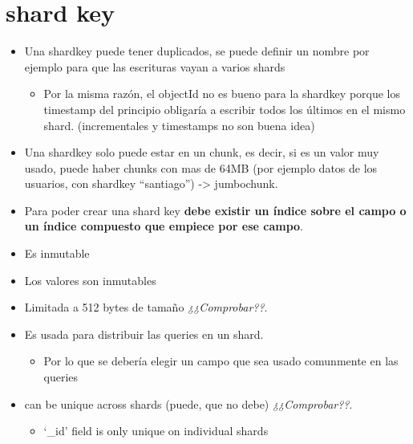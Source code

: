 \documentclass[a4paper,10pt,english]{sphinxmanual}
\begin{document}
\section{shard key}
\label{contents/sharding:shard-key}\begin{itemize}
\item {} 
Una shardkey puede tener duplicados, se puede definir un nombre por ejemplo para que las escrituras vayan a varios shards
\begin{itemize}
\item {} 
Por la misma razón, el objectId no es bueno para la shardkey porque los timestamp del principio obligaría a escribir todos los últimos en el mismo shard. (incrementales y timestamps no son buena idea)

\end{itemize}

\item {} 
Una shardkey solo puede estar en un chunk, es decir, si es un valor muy usado, puede haber chunks con mas de 64MB (por ejemplo datos de los usuarios, con shardkey ``santiago'') -\textgreater{} jumbochunk.

\item {} 
Para poder crear una shard key \textbf{debe existir un índice sobre el campo o un índice compuesto que empiece por ese campo}.

\item {} 
Es inmutable

\item {} 
Los valores son inmutables

\item {} 
Limitada a 512 bytes de tamaño \emph{¿¿Comprobar??}.

\item {} 
Es usada para distribuir las queries en un shard.
\begin{itemize}
\item {} 
Por lo que se debería elegir un campo que sea usado comunmente en las queries

\end{itemize}

\item {} 
can be unique across shards (puede, que no debe) \emph{¿¿Comprobar??}.
\begin{itemize}
\item {} 
`\_id' field is only unique on individual shards

\end{itemize}

\end{itemize}
\end{document}
